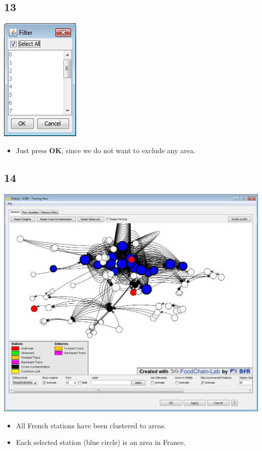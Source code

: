 \documentclass{beamer}
\begin{document}
\subsection{13}
\begin{frame}
	\begin{center}
  		\includegraphics[height=0.5\textheight]{13.png}
	\end{center}
	\begin{itemize}
		\item Just press \textbf{OK}, since we do not want to exclude any area.
	\end{itemize}
\end{frame}

\subsection{14}
\begin{frame}
	\begin{center}
  		\includegraphics[height=0.6\textheight]{14.png}
	\end{center}
	\begin{itemize}
		\item All French stations have been clustered to areas.
		\item Each selected station (blue circle) is an area in France.		
	\end{itemize}
\end{frame}
\end{document}
